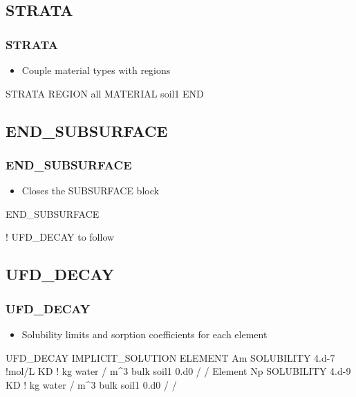 \documentclass{beamer}
\newcommand\bluecomment[1]{{{\color{blue} #1}}}
\begin{document}
\subsection{STRATA}

\begin{frame}[fragile]\frametitle{STRATA}
	
\begin{itemize}
\item Couple material types with regions
\end{itemize}
	
\begin{semiverbatim}
STRATA
  REGION all
  MATERIAL soil1
END
		
\end{semiverbatim}
	
\end{frame}


\subsection{END\_SUBSURFACE}

\begin{frame}[fragile]\frametitle{END\_SUBSURFACE}
	
\begin{itemize}
\item Closes the SUBSURFACE block
\end{itemize}
	
\begin{semiverbatim}
END_SUBSURFACE
		
\end{semiverbatim}
	
\bluecomment{! UFD\_DECAY to follow}
\end{frame}
\subsection{UFD\_DECAY}

\begin{frame}[fragile]\frametitle{UFD\_DECAY}
	
\begin{itemize}
\item Solubility limits and sorption coefficients for each element
\end{itemize}
	
\begin{semiverbatim}
UFD_DECAY
  IMPLICIT_SOLUTION
  ELEMENT Am
    SOLUBILITY 4.d-7 \bluecomment{!mol/L}
    KD \bluecomment{! kg water / m^3 bulk}
      soil1 0.d0
    /
  /
  Element Np
    SOLUBILITY 4.d-9
    KD \bluecomment{! kg water / m^3 bulk}
      soil1 0.d0
    /
  /
		
\end{semiverbatim}
	
\end{frame}
\end{document}
